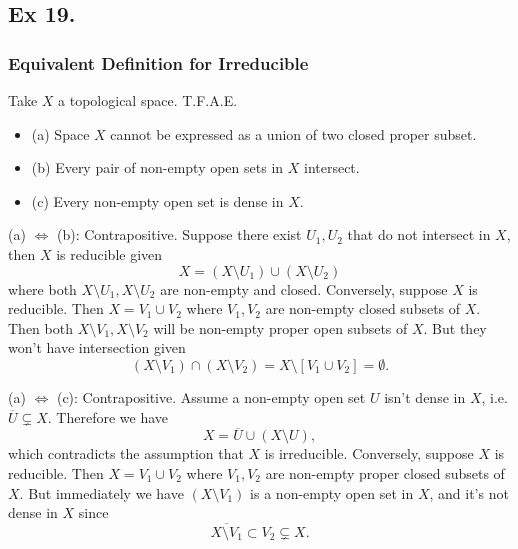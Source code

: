 \subsection{Ex 19.}\label{Atiyah Chapter 1 Ex 19.}

\subsubsection{Equivalent Definition for Irreducible}

Take $X$ a topological space. T.F.A.E. 
\begin{itemize}
    \item (a) Space $X$ cannot be expressed as a union of two closed proper subset.
    \item (b) Every pair of non-empty open sets in $X$ intersect.
    \item (c) Every non-empty open set is dense in $X$.
\end{itemize}

(a) $\Leftrightarrow$ (b): Contrapositive. Suppose there exist $U_1,U_2$ that do not intersect in $X$, then $X$ is reducible given $$X=(X\setminus U_1)\cup(X\setminus U_2)$$ where both $X\setminus U_1,X\setminus U_2$ are non-empty and closed. 
Conversely, suppose $X$ is reducible. Then $X=V_1\cup V_2$ where $V_1,V_2$ are non-empty closed subsets of $X$. Then both $X\setminus V_1,X\setminus V_2$ will be non-empty proper open subsets of $X$. But they won't have intersection given 
$$(X\setminus V_1)\cap(X\setminus V_2)=X\setminus [V_1\cup V_2]=\emptyset.$$

(a) $\Leftrightarrow$ (c): Contrapositive. Assume a non-empty open set $U$ isn't dense in $X$, i.e. $\overline{U}\subsetneq X$. Therefore we have $$X=\overline{U}\cup (X\setminus U),$$ which contradicts the assumption that $X$ is irreducible. Conversely, suppose $X$ is reducible. Then $X=V_1\cup V_2$ where $V_1,V_2$ are non-empty proper closed subsets of $X$. But immediately we have $(X\setminus V_1)$ is a non-empty open set in $X$, and it's not dense in $X$ since 
$$\overline{X\setminus V_1}\subset V_2\subsetneq X.$$

\subsubsection{}

